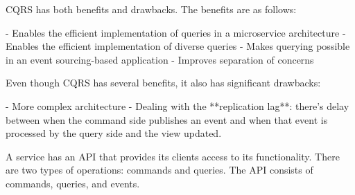 \documentclass[conference]{IEEEtran}
\begin{document}
CQRS has both benefits and drawbacks. The benefits are as follows:

- Enables the efficient implementation of queries in a microservice architecture
- Enables the efficient implementation of diverse queries
- Makes querying possible in an event sourcing-based application
- Improves separation of concerns

Even though CQRS has several benefits, it also has significant drawbacks:

- More complex architecture
- Dealing with the **replication lag**: there’s delay between when the command side publishes an event and when that event is processed by the query side and the view updated.

A service has an API that provides its clients access to its functionality. There are two types of operations: commands and queries. The API consists of commands, queries, and events.

%
%



%
%
\end{document}
